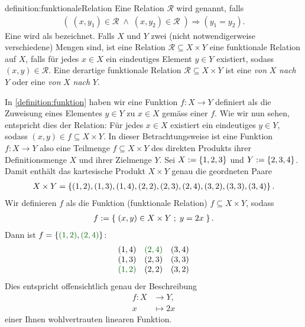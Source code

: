 \begin{definition}{definition:funktionaleRelation}
Eine Relation $\mathcal{R}$ wird  genannt, falls
\begin{align*}
    (\;(x,y_1)\in\mathcal{R}\;\land\; (x,y_2)\in\mathcal{R}\;) \Rightarrow (y_1=y_2).
\end{align*}
Eine  wird als  bezeichnet. Falls $X$ und $Y$ zwei (nicht notwendigerweise verschiedene) Mengen sind, ist eine Relation $\mathcal{R}\subseteq X\times Y$ eine funktionale Relation auf $X$, falls für jedes $x\in X$ ein eindeutiges Element $y\in Y$ existiert, sodass $(x,y)\in\mathcal{R}$. Eine derartige funktionale Relation $\mathcal{R}\subseteq X\times Y$ ist eine  \textit{von} $X$ \textit{nach} $Y$ oder eine  \textit{von} $X$ \textit{nach} $Y$.
\end{definition}
In \cref{definition:funktion} haben wir eine Funktion $f:X\to Y$ definiert als die Zuweisung eines Elementes $y\in Y$  zu $x\in X$ gemäss einer  $f$. Wie wir nun sehen, entspricht dies der Relation: Für jedes $x\in X$ existiert ein eindeutiges $y\in Y$, sodass $(x,y)\in f\subseteq X\times Y$. In dieser Betrachtungsweise ist eine Funktion $f: X\to Y$ also eine Teilmenge $f\subseteq X\times Y$ des direkten Produkts ihrer Definitionsmenge $X$ und ihrer Zielmenge $Y$.
\beispiel{-}
{
    Sei $X:=\left\{1,2,3\right\}$ und $Y:=\left\{2,3,4\right\}$. Damit enthält das kartesische Produkt $X\times Y$ genau die geordneten Paare
    \begin{align*}
        X\times Y =\left\{(1,2),(1,3),(1,4),(2,2),(2,3),(2,4),(3,2),(3,3),(3,4)\right\}.
    \end{align*}
    Wir definieren $f$ als die Funktion (funktionale Relation) $f\subseteq X\times Y$, sodass
    \begin{align*}
        f := \left\{\;(x,y)\in X\times Y \; ; \; y=2x \;\right\}.
    \end{align*}
    Dann ist $f =\lrc{\textcolor{DarkGreen}{(1,2)},\textcolor{DarkGreen}{(2,4)}}$:
    \begin{align*}
        \begin{matrix*}[r]
            (1,4) & \textcolor{DarkGreen}{(2,4)} & (3,4)\\
            (1,3) & (2,3) & (3,3)\\
            \textcolor{DarkGreen}{(1,2)} & (2,2) & (3,2)\\
        \end{matrix*}
    \end{align*}
    Dies entspricht offensichtlich genau der Beschreibung
    \begin{align*}
        f: X &\to Y,\\
        x &\mapsto 2x
    \end{align*}
einer Ihnen wohlvertrauten linearen Funktion.
}

